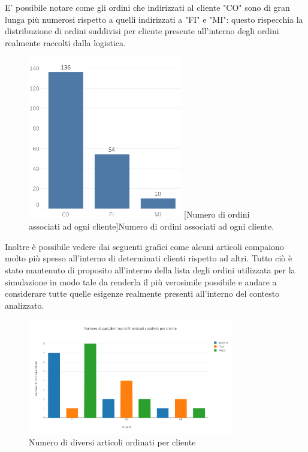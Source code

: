 \documentclass[12pt]{article}
\begin{document}
\noindent E' possibile notare come gli ordini che indirizzati al cliente "CO" sono di gran lunga più numerosi rispetto a quelli indirizzati a "FI" e "MI": questo rispecchia la distribuzione di ordini suddivisi per cliente presente all'interno degli ordini realmente raccolti dalla logistica.

\begin{figure}[ht]
\centering
\includegraphics[width=0.6\textwidth,keepaspectratio]{Figures/Graphics/Orders_simulation.png}
[Numero di ordini associati ad ogni cliente]{Numero di ordini associati ad ogni cliente.}
\label{fig:OrdiniSimulazione}
\end{figure}

\noindent Inoltre è possibile vedere dai seguenti grafici come alcuni articoli compaiono molto più spesso all'interno di determinati clienti rispetto ad altri. 
\noindent Tutto ciò è stato mantenuto di proposito all'interno della lista degli ordini utilizzata per la simulazione in modo tale da renderla il più verosimile possibile e andare a considerare tutte quelle esigenze realmente presenti all'interno del contesto analizzato.

\begin{figure}[ht]
\centering
\includegraphics[width=0.8\textwidth,keepaspectratio]{Figures/Graphics/articoli_clienti.png}
\caption[Numero di diversi articoli per cliente]{Numero di diversi articoli ordinati per cliente}
\label{fig:Electron}
\end{figure}
\end{document}
